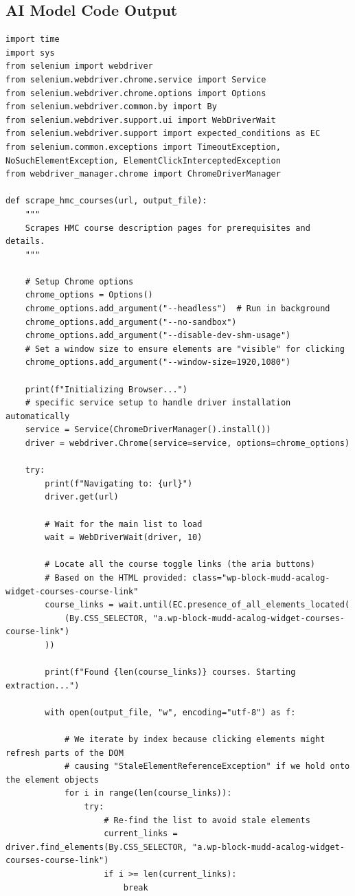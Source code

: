 \documentclass[12pt]{article}
\begin{document}
\subsection{AI Model Code Output} 
\begin{lstlisting}
import time
import sys
from selenium import webdriver
from selenium.webdriver.chrome.service import Service
from selenium.webdriver.chrome.options import Options
from selenium.webdriver.common.by import By
from selenium.webdriver.support.ui import WebDriverWait
from selenium.webdriver.support import expected_conditions as EC
from selenium.common.exceptions import TimeoutException, NoSuchElementException, ElementClickInterceptedException
from webdriver_manager.chrome import ChromeDriverManager

def scrape_hmc_courses(url, output_file):
    """
    Scrapes HMC course description pages for prerequisites and details.
    """
    
    # Setup Chrome options
    chrome_options = Options()
    chrome_options.add_argument("--headless")  # Run in background
    chrome_options.add_argument("--no-sandbox")
    chrome_options.add_argument("--disable-dev-shm-usage")
    # Set a window size to ensure elements are "visible" for clicking
    chrome_options.add_argument("--window-size=1920,1080")

    print(f"Initializing Browser...")
    # specific service setup to handle driver installation automatically
    service = Service(ChromeDriverManager().install())
    driver = webdriver.Chrome(service=service, options=chrome_options)

    try:
        print(f"Navigating to: {url}")
        driver.get(url)

        # Wait for the main list to load
        wait = WebDriverWait(driver, 10)
        
        # Locate all the course toggle links (the aria buttons)
        # Based on the HTML provided: class="wp-block-mudd-acalog-widget-courses-course-link"
        course_links = wait.until(EC.presence_of_all_elements_located(
            (By.CSS_SELECTOR, "a.wp-block-mudd-acalog-widget-courses-course-link")
        ))
        
        print(f"Found {len(course_links)} courses. Starting extraction...")

        with open(output_file, "w", encoding="utf-8") as f:
            
            # We iterate by index because clicking elements might refresh parts of the DOM
            # causing "StaleElementReferenceException" if we hold onto the element objects
            for i in range(len(course_links)):
                try:
                    # Re-find the list to avoid stale elements
                    current_links = driver.find_elements(By.CSS_SELECTOR, "a.wp-block-mudd-acalog-widget-courses-course-link")
                    if i >= len(current_links):
                        break
                    

\end{lstlisting}
\end{document}
